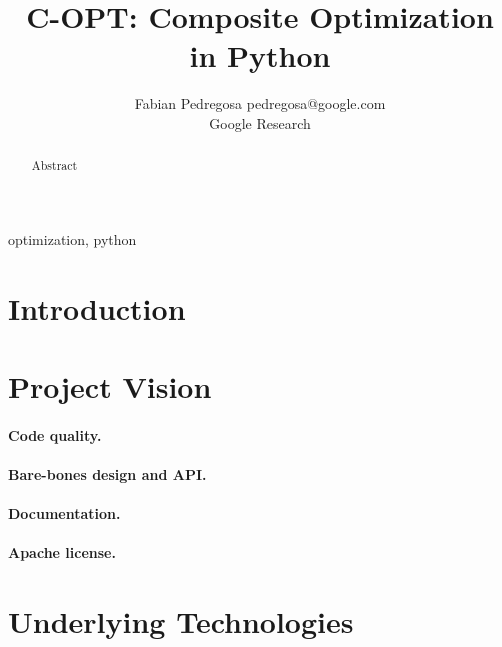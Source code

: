 \documentclass[twoside,11pt]{article}
\begin{document}
\title{C-OPT: Composite Optimization in Python}
\author{\name Fabian Pedregosa \email pedregosa@google.com \\
       \addr Google Research\\
}
\editor{}


\maketitle


\begin{abstract}
Abstract
\end{abstract}

\begin{keywords}
  optimization, python
\end{keywords}

\section{Introduction}


\section{Project Vision}

\paragraph{Code quality.}

\paragraph{Bare-bones design and API.}

\paragraph{Documentation.}

\paragraph{Apache license.}


\section{Underlying Technologies}

\citep{virtanen2019scipy}

\citep{pedregosa2011scikit}


\end{document}
